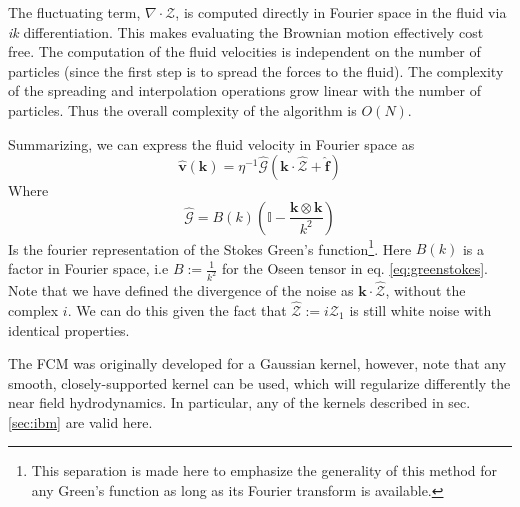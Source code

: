 \documentclass[ twoside,openright,titlepage,numbers=noenddot,%
headinclude,footinclude,cleardoublepage=empty,abstract=on,
BCOR=5mm,paper=a4,fontsize=11pt, dvipsnames
]{scrreprt}
\renewcommand{\vec}[1]{\bm{#1}}
\newcommand{\tens}[1]{\bm{\mathcal{#1}}}
\newcommand{\fou}[1]{\widehat{#1}}
\newcommand{\fvel}{v}
\begin{document}
The fluctuating term, $\nabla\cdot\mathcal{Z}$, is computed directly in Fourier space in the fluid via \emph{ik} differentiation. This makes evaluating the Brownian motion effectively cost free.
The computation of the fluid velocities is independent on the number of particles (since the first step is to spread the forces to the fluid). The complexity of the spreading and interpolation operations grow linear with the number of particles. Thus the overall complexity of the algorithm is $O(N)$.

Summarizing, we can express the fluid velocity in Fourier space as
\begin{equation}
  \label{eq:fcmvel}
  \fou{\vec{\fvel}}(\vec{k}) = \eta^{-1}\hat{\tens{G}}\left(\vec{k}\cdot\fou{\mathcal{Z}} + \fou{\vec{f}}\right)
\end{equation}
Where
\begin{equation}
  \fou{\tens{G}} = B(k)\left(\mathbb{I} - \frac{\vec{k}\otimes\vec{k}}{k^2}\right)
\end{equation}
Is the fourier representation of the Stokes Green's function\footnote{This separation is made here to emphasize the generality of this method for any Green's function as long as its Fourier transform is available.}.
Here $B(k)$ is a factor in Fourier space, i.e $B := \frac{1}{k^2}$ for the Oseen tensor in eq. \eqref{eq:greenstokes}.
Note that we have defined the divergence of the noise as $\vec{k}\cdot\fou{\mathcal{Z}}$, without the complex $i$. We can do this given the fact that $\fou{\mathcal{Z}} := i\fou{\mathcal{Z}}_1$ is still white noise with identical properties.

The \gls{FCM} was originally developed for a Gaussian kernel, however, note that any smooth, closely-supported kernel can be used, which will regularize differently the near field hydrodynamics. In particular, any of the kernels described in sec. \ref{sec:ibm} are valid here.
\end{document}
